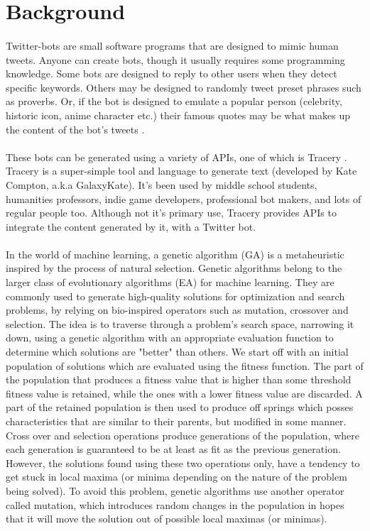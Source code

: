 \section{Background}
\paragraph{}
Twitter-bots are small software programs that are designed to mimic human tweets. Anyone can create bots, though it usually requires some programming knowledge. Some bots are designed to reply to other users when they detect specific keywords. Others may be designed to randomly tweet preset phrases such as proverbs. Or, if the bot is designed to emulate a popular person (celebrity, historic icon, anime character etc.) their famous quotes may be what makes up the content of the bot's tweets \cite{twitterBot}.
\paragraph{}
These bots can be generated using a variety of APIs, one of which is Tracery \cite{tracery}. Tracery is a super-simple tool and language to generate text (developed by Kate Compton, a.k.a GalaxyKate). It's been used by middle school students, humanities professors, indie game developers, professional bot makers, and lots of regular people too. Although not it's primary use, Tracery provides APIs to integrate the content generated by it, with a Twitter bot.
\paragraph{}
In the world of machine learning, a genetic algorithm (GA) is a metaheuristic inspired by the process of natural selection. Genetic algorithms belong to the larger class of evolutionary algorithms (EA) for machine learning. They are commonly used to generate high-quality solutions for optimization and search problems, by relying on bio-inspired operators such as mutation, crossover and selection\cite{geneticAlgorithm}. The idea is to traverse through a problem's search space, narrowing it down, using a genetic algorithm with an appropriate evaluation function to determine which solutions are "better" than others. We start off with an initial population of solutions which are evaluated using the fitness function. The part of the population that produces a fitness value that is higher than some threshold fitness value is retained, while the ones with a lower fitness value are discarded. A part of the retained population is then used to produce off springs which posses characteristics that are similar to their parents, but modified in some manner. Cross over and selection operations produce generations of the population, where each generation is guaranteed to be at least as fit as the previous generation. However, the solutions found using these two operations only, have a tendency to get stuck in local maxima (or minima depending on the nature of the problem being solved). To avoid this problem, genetic algorithms use another operator called mutation, which introduces random changes in the population in hopes that it will move the solution out of possible local maximas (or minimas).